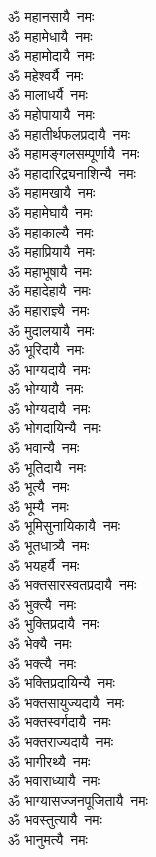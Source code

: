 \begin{flushleft}
\begin{multicols}{2}
ॐ महानसायै~नमः\\
ॐ महामेधायै~नमः\\
ॐ महामोदायै~नमः\\
ॐ महेश्वर्यै~नमः\\
ॐ मालाधर्यै~नमः\\
ॐ महोपायायै~नमः\hfill{}\\
ॐ महातीर्थफलप्रदायै~नमः\\
ॐ महामङ्गलसम्पूर्णायै~नमः\\
ॐ महादारिद्र्यनाशिन्यै~नमः\\
ॐ महामखायै~नमः\\
ॐ महामेघायै~नमः\\
ॐ महाकाल्यै~नमः\\
ॐ महाप्रियायै~नमः\\
ॐ महाभूषायै~नमः\\
ॐ महादेहायै~नमः\\
ॐ महाराज्ञ्यै~नमः\hfill{}\\
ॐ मुदालयायै~नमः\\
ॐ भूरिदायै~नमः\\
ॐ भाग्यदायै~नमः\\
ॐ भोग्यायै~नमः\\
ॐ भोग्यदायै~नमः\\
ॐ भोगदायिन्यै~नमः\\
ॐ भवान्यै~नमः\\
ॐ भूतिदायै~नमः\\
ॐ भूत्यै~नमः\\
ॐ भूम्यै~नमः\hfill{}\\
ॐ भूमिसुनायिकायै~नमः\\
ॐ भूतधात्र्यै~नमः\\
ॐ भयहर्यै~नमः\\
ॐ भक्तसारस्वतप्रदायै~नमः\\
ॐ भुक्त्यै~नमः\\
ॐ भुक्तिप्रदायै~नमः\\
ॐ भेक्यै~नमः\\
ॐ भक्त्यै~नमः\\
ॐ भक्तिप्रदायिन्यै~नमः\\
ॐ भक्तसायुज्यदायै~नमः\hfill{}\\
ॐ भक्तस्वर्गदायै~नमः\\
ॐ भक्तराज्यदायै~नमः\\
ॐ भागीरथ्यै~नमः\\
ॐ भवाराध्यायै~नमः\\
ॐ भाग्यासज्जनपूजितायै~नमः\\
ॐ भवस्तुत्यायै~नमः\\
ॐ भानुमत्यै~नमः\\

\end{multicols}
\end{flushleft}
